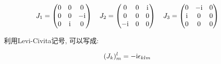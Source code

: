 \begin{equation}
  \begin{aligned}
    J_1 =
    \begin{pmatrix}
      0 & 0 & 0 \\
      0 & 0 & - {\rm i} \\
      0 & {\rm i} & 0 \\
    \end{pmatrix}\quad
    J_2 =
    \begin{pmatrix}
      0 & 0 & {\rm i}\\
      0 & 0 & 0\\
      - {\rm i} & 0 & 0
    \end{pmatrix}\quad
    J_3 = 
    \begin{pmatrix}
      0 & - {\rm i} & 0\\
      {\rm i} & 0 & 0\\
      0 & 0 & 0
    \end{pmatrix}
  \end{aligned}
\end{equation}

利用Levi-Civita记号, 可以写成:

\begin{equation}\label{eq:lc_form_j_n}
  \begin{aligned}
    (J_{k})^{l}_{m} = - {\rm i} \epsilon_{klm}
  \end{aligned}
\end{equation}

